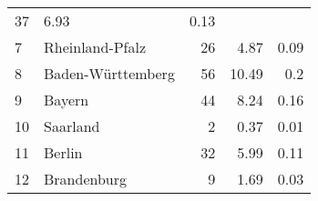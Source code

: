 \begin{longtable}{lXrrr}
       \num{37} &
       \num[round-mode=places,round-precision=2]{6,93} &
         \num[round-mode=places,round-precision=2]{0,13} \\

     7 &
     \multicolumn{1}{X}{ Rheinland-Pfalz   } &


       \num{26} &
       \num[round-mode=places,round-precision=2]{4,87} &
         \num[round-mode=places,round-precision=2]{0,09} \\

     8 &
     \multicolumn{1}{X}{ Baden-Württemberg   } &


       \num{56} &
       \num[round-mode=places,round-precision=2]{10,49} &
         \num[round-mode=places,round-precision=2]{0,2} \\

     9 &
     \multicolumn{1}{X}{ Bayern   } &


       \num{44} &
       \num[round-mode=places,round-precision=2]{8,24} &
         \num[round-mode=places,round-precision=2]{0,16} \\

     10 &
     \multicolumn{1}{X}{ Saarland   } &


       \num{2} &
       \num[round-mode=places,round-precision=2]{0,37} &
         \num[round-mode=places,round-precision=2]{0,01} \\

     11 &
     \multicolumn{1}{X}{ Berlin   } &


       \num{32} &
       \num[round-mode=places,round-precision=2]{5,99} &
         \num[round-mode=places,round-precision=2]{0,11} \\

     12 &
     \multicolumn{1}{X}{ Brandenburg   } &


       \num{9} &
       \num[round-mode=places,round-precision=2]{1,69} &
         \num[round-mode=places,round-precision=2]{0,03} \\


\end{longtable}
